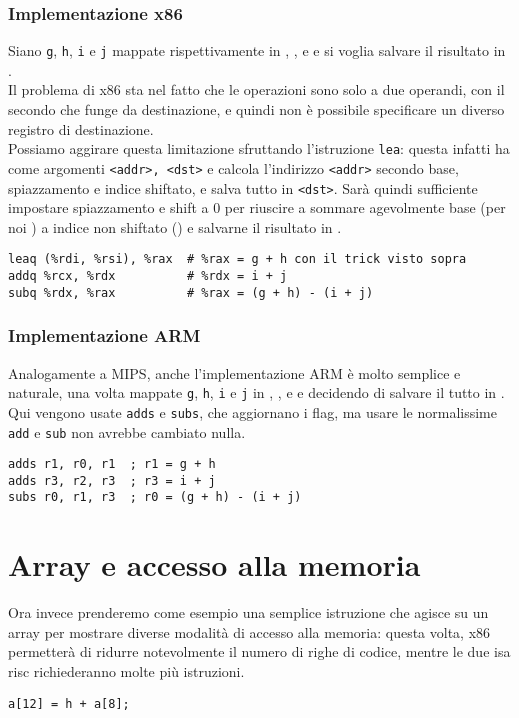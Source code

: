 \documentclass[class=book, crop=false, oneside]{standalone}
\begin{document}
\subsubsection{Implementazione x86}
Siano \texttt{g}, \texttt{h}, \texttt{i} e \texttt{j} mappate rispettivamente in , ,  e  e si voglia salvare il risultato in .\\
Il problema di x86 sta nel fatto che le operazioni sono solo a due operandi, con il secondo che funge da destinazione, e quindi non è possibile specificare un diverso registro di destinazione.\\
Possiamo aggirare questa limitazione sfruttando l'istruzione \texttt{lea}: questa infatti ha come argomenti \texttt{<addr>, <dst>} e calcola l'indirizzo \texttt{<addr>} secondo base, spiazzamento e indice shiftato, e salva tutto in \texttt{<dst>}. Sarà quindi sufficiente impostare spiazzamento e shift a 0 per riuscire a sommare agevolmente base (per noi ) a indice non shiftato () e salvarne il risultato in .
\begin{verbatim}
leaq (%rdi, %rsi), %rax  # %rax = g + h con il trick visto sopra
addq %rcx, %rdx          # %rdx = i + j
subq %rdx, %rax          # %rax = (g + h) - (i + j)
\end{verbatim}

\subsubsection{Implementazione ARM}
Analogamente a MIPS, anche l'implementazione ARM è molto semplice e naturale, una volta mappate \texttt{g}, \texttt{h}, \texttt{i} e \texttt{j} in , ,  e  e decidendo di salvare il tutto in .\\
Qui vengono usate \texttt{adds} e \texttt{subs}, che aggiornano i flag, ma usare le normalissime \texttt{add} e \texttt{sub} non avrebbe cambiato nulla.
\begin{verbatim}
adds r1, r0, r1  ; r1 = g + h
adds r3, r2, r3  ; r3 = i + j
subs r0, r1, r3  ; r0 = (g + h) - (i + j)
\end{verbatim}

\section{Array e accesso alla memoria}
Ora invece prenderemo come esempio una semplice istruzione che agisce su un array per mostrare diverse modalità di accesso alla memoria: questa volta, x86 permetterà di ridurre notevolmente il numero di righe di codice, mentre le due \acrshort{isa} \acrshort{risc} richiederanno molte più istruzioni.
\begin{verbatim}
a[12] = h + a[8];
\end{verbatim}
\end{document}

